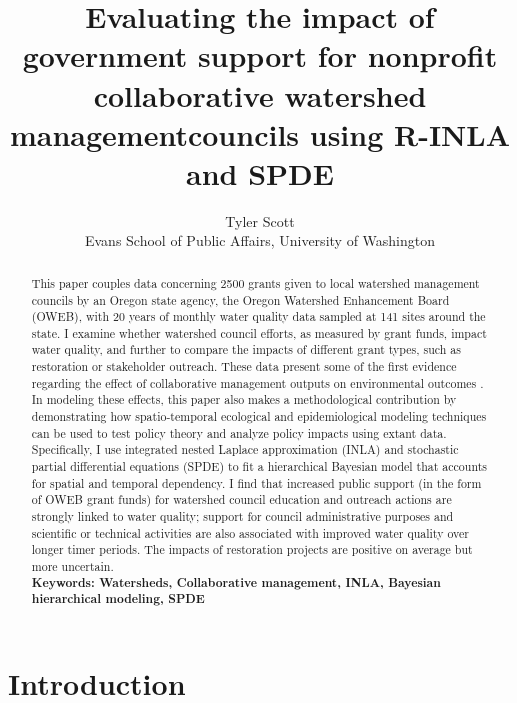 \documentclass[11pt,a4paper,titlepage]{article}
\title{Evaluating the impact of government support for nonprofit collaborative watershed managementcouncils using R-INLA and SPDE}
\author{Tyler Scott\\ Evans School of Public Affairs, University of Washington}
\begin{document}
\maketitle

\begin{abstract}

This paper couples data concerning 2500 grants given to local watershed management councils by an Oregon state agency, the Oregon Watershed Enhancement Board (OWEB), with 20 years of monthly water quality data sampled at 141 sites around the state. I examine whether watershed council efforts, as measured by grant funds, impact water quality, and further to compare the impacts of different grant types, such as restoration or stakeholder outreach. These data present some of the first evidence regarding the effect of collaborative management outputs on environmental outcomes \parencite{carr2012,koontz2006}. In modeling these effects, this paper also makes a methodological contribution by demonstrating how spatio-temporal ecological and epidemiological modeling techniques can be used to test policy theory and analyze policy impacts using extant data. Specifically, I use integrated nested Laplace approximation (INLA) \parencite{rue2009} and stochastic partial differential equations (SPDE) \parencite{lindgren2011} to fit a hierarchical Bayesian model that accounts for spatial and temporal dependency. I find that increased public support (in the form of OWEB grant funds) for watershed council education and outreach actions are strongly linked to water quality; support for council administrative purposes and scientific or technical activities are also associated with improved water quality over longer timer periods. The impacts of restoration projects are positive on average but more uncertain.\\


\noindent
\bf{Keywords}: Watersheds, Collaborative management, INLA, Bayesian hierarchical modeling, SPDE
\end{abstract}


\section*{Introduction}
\end{document}
